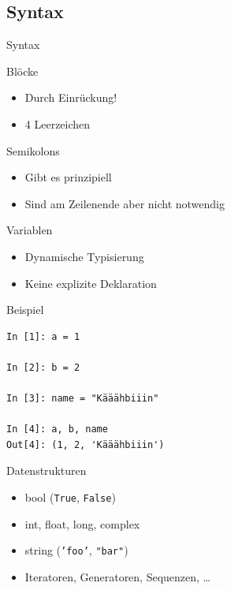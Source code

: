 \subsection{Syntax}
\begin{frame}{Syntax}
  \begin{block}{Blöcke}
    \begin{itemize}
      \item Durch Einrückung!
      \item 4 Leerzeichen
    \end{itemize}
  \end{block}
  \begin{block}{Semikolons}
  \begin{itemize}
    \item Gibt es prinzipiell
    \item Sind am Zeilenende aber nicht notwendig
  \end{itemize}
  \end{block}
\end{frame}

\begin{frame}[fragile]{Variablen}
  \begin{itemize}
    \item Dynamische Typisierung
    \item Keine explizite Deklaration 
  \end{itemize}
  \begin{spacing}{1.0}
    \begin{exampleblock}{Beispiel}
      \begin{verbatim}
In [1]: a = 1

In [2]: b = 2

In [3]: name = "Kääähbiiin"

In [4]: a, b, name
Out[4]: (1, 2, 'Kääähbiiin')
      \end{verbatim}
    \end{exampleblock}
  \end{spacing}  
\end{frame}

\begin{frame}{Datenstrukturen}
  \begin{itemize}
    \item bool (\texttt{True}, \texttt{False})
    \item int, float, long, complex
    \item string (\texttt{'foo'}, \texttt{"bar"})
    \item Iteratoren, Generatoren, Sequenzen, …
  \end{itemize}
\end{frame}

